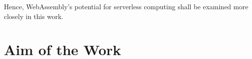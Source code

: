 Hence, WebAssembly's potential for serverless computing shall be examined more closely in this work.





\section{Aim of the Work}

